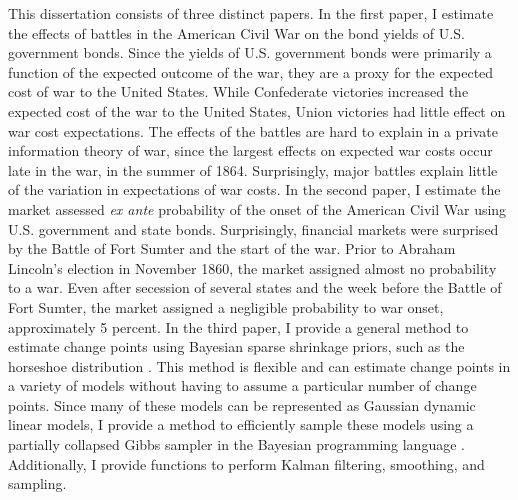 
This dissertation consists of three distinct papers.
In the first paper, I estimate the effects of battles in the American Civil War on the bond yields of U.S. government bonds.
Since the yields of U.S. government bonds were primarily a function of the expected outcome of the war, they are a proxy for the expected cost of war to the United States.
While Confederate victories increased the expected cost of the war to the United States, Union victories had little effect on war cost expectations.
The effects of the battles are hard to explain in a private information theory of war, since the largest effects on expected war costs occur late in the war, in the summer of 1864.
Surprisingly, major battles explain little of the variation in expectations of war costs.
In the second paper, I estimate the market assessed \textit{ex ante} probability of the onset of the American Civil War using U.S. government and state bonds.
Surprisingly, financial markets were surprised by the Battle of Fort Sumter and the start of the war.
Prior to Abraham Lincoln's election in November 1860, the market assigned almost no probability to a war.
Even after secession of several states and the week before the Battle of Fort Sumter, the market assigned a negligible probability to war onset, approximately 5 percent.
In the third paper, I provide a general method to estimate change points using Bayesian sparse shrinkage priors, such as the horseshoe distribution \parencite{CarvalhoPolsonScott2010}.
This method is flexible and can estimate change points in a variety of models without having to assume a particular number of change points.
Since many of these models can be represented as Gaussian dynamic linear models, I provide a method to efficiently sample these models using a partially collapsed Gibbs sampler in the Bayesian programming language \Stan{}.
Additionally, I provide \Stan{} functions to perform Kalman filtering, smoothing, and sampling.




